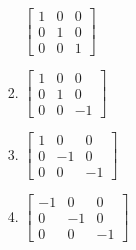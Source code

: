 \documentclass[journal,12pt,twocolumn]{IEEEtran}
\theoremstyle{remark}
\begin{document}
\begin{enumerate}
\begin{enumerate}
\begin{enumerate}
								$\begin{bmatrix}
									1&0&0\\
									0&1&0\\
									0&0&1
								\end{bmatrix}$
							\item 
								$\begin{bmatrix}
									1&0&0\\
									0&1&0\\
									0&0&-1
								\end{bmatrix}$
							\item 
								$\begin{bmatrix}
									1&0&0\\
									0&-1&0\\
									0&0&-1
								\end{bmatrix}$
							\item 
								$\begin{bmatrix}
									-1&0&0\\
									0&-1&0\\
									0&0&-1
								\end{bmatrix}$
						\end{enumerate}
						\hfill {}
						\begin{comment}
					\item
						Let $S$ be the set of all column matrices 
												$\begin{bmatrix}
													b_1\\
													b_2\\
													b_3
												\end{bmatrix}$
						such that $b_1, b_2, b_3, \in \mathbb{R}$ and the system of equations \brak{in real variables} $$-x+2y+5z=b_1$$ $$2x-4y+3z=b_2$$  $$x-2y+2z=b_3$$ has atleast one solution. Then, which of the following system\brak{s} \brak{in real variables} has\brak{have} at least one solution for each  
												$\begin{bmatrix}
													b_1\\
													b_2\\
													b_3
												\end{bmatrix}$
						$\in S$?
						\begin{enumerate}
							\item $x+2y+3z=b_1, 4y+5z=b_2 $ and $x+2y+6z=b_3$
							\item $x+y+3z=b_1, 5x+2y+6z=b_2 $ and $-2x+y-3z=b_3$
							\item $-x+2y+-5z=b_1, 2x-4y+10z=b_2 $ and $x-2y+5z=b_3$
							\item $sx+2y+5z=b_1, 2x+3z=b_2 $ and $x+4y-5z=b_3$
						\end{enumerate}
						\hfill \brak{JEE Adv. 2018}
						\end{comment}
			\end{enumerate}
		
\end{enumerate}
\end{document}
